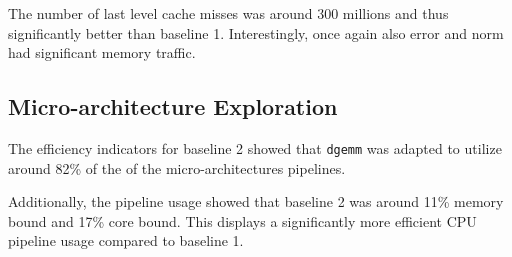 \documentclass[11pt]{article}
\begin{document}
The number of last level cache misses was around 300 millions and thus significantly better than baseline 1. Interestingly, once again also error and norm had significant memory traffic.

\subsection*{Micro-architecture Exploration}

The efficiency indicators for baseline 2 showed that \texttt{dgemm} was adapted to utilize around 82\% of the of the micro-architectures pipelines.

Additionally, the pipeline usage showed that baseline 2 was around 11\% memory bound and 17\% core bound. This displays a significantly more efficient CPU pipeline usage compared to baseline 1.
\end{document}

